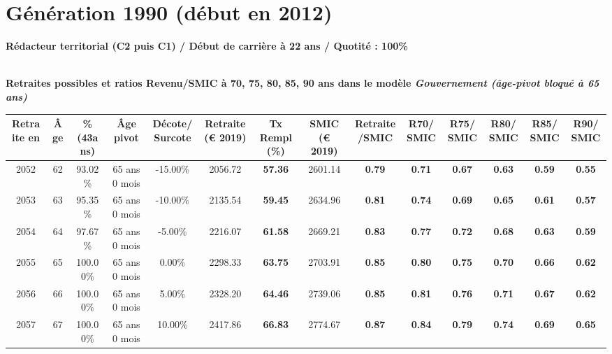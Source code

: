 \newpage 
 
\section{Génération 1990 (début en 2012)\label{Redacteur_100_1990_22_0}} 
 
{\bf \noindent Rédacteur territorial (C2 puis C1) / Début de carrière à 22 ans / Quotité : 100\%}  ~ 

 ~\\{\bf \noindent Retraites possibles et ratios Revenu/SMIC à 70, 75, 80, 85, 90 ans dans le modèle \emph{Gouvernement (âge-pivot bloqué à 65 ans)}}  
 
\begin{adjustbox}{max width=\textwidth} 
\begin{tabular}[htb]{|c|c||c|c|c||c|c||c|c||c|c|c|c|c|} 
\hline 
 Retraite en &  Âge &  \%(43ans) &  Âge pivot &  Décote/Surcote &  Retraite (\euro{} 2019) &  Tx Rempl(\%) &  SMIC (\euro{} 2019) &  Retraite/SMIC &  R70/SMIC &  R75/SMIC &  R80/SMIC &  R85/SMIC &  R90/SMIC \\ 
\hline \hline 
 2052 &  62 &  93.02\% &  65 ans 0 mois &  -15.00\% &  2056.72 &  {\bf 57.36} &  2601.14 &  {\bf {\color{red} 0.79}} &  {\bf {\color{red} 0.71}} &  {\bf {\color{red} 0.67}} &  {\bf {\color{red} 0.63}} &  {\bf {\color{red} 0.59}} &  {\bf {\color{red} 0.55}} \\ 
\hline 
 2053 &  63 &  95.35\% &  65 ans 0 mois &  -10.00\% &  2135.54 &  {\bf 59.45} &  2634.96 &  {\bf {\color{red} 0.81}} &  {\bf {\color{red} 0.74}} &  {\bf {\color{red} 0.69}} &  {\bf {\color{red} 0.65}} &  {\bf {\color{red} 0.61}} &  {\bf {\color{red} 0.57}} \\ 
\hline 
 2054 &  64 &  97.67\% &  65 ans 0 mois &  -5.00\% &  2216.07 &  {\bf 61.58} &  2669.21 &  {\bf {\color{red} 0.83}} &  {\bf {\color{red} 0.77}} &  {\bf {\color{red} 0.72}} &  {\bf {\color{red} 0.68}} &  {\bf {\color{red} 0.63}} &  {\bf {\color{red} 0.59}} \\ 
\hline 
 2055 &  65 &  100.00\% &  65 ans 0 mois &  0.00\% &  2298.33 &  {\bf 63.75} &  2703.91 &  {\bf {\color{red} 0.85}} &  {\bf {\color{red} 0.80}} &  {\bf {\color{red} 0.75}} &  {\bf {\color{red} 0.70}} &  {\bf {\color{red} 0.66}} &  {\bf {\color{red} 0.62}} \\ 
\hline 
 2056 &  66 &  100.00\% &  65 ans 0 mois &  5.00\% &  2328.20 &  {\bf 64.46} &  2739.06 &  {\bf {\color{red} 0.85}} &  {\bf {\color{red} 0.81}} &  {\bf {\color{red} 0.76}} &  {\bf {\color{red} 0.71}} &  {\bf {\color{red} 0.67}} &  {\bf {\color{red} 0.62}} \\ 
\hline 
 2057 &  67 &  100.00\% &  65 ans 0 mois &  10.00\% &  2417.86 &  {\bf 66.83} &  2774.67 &  {\bf {\color{red} 0.87}} &  {\bf {\color{red} 0.84}} &  {\bf {\color{red} 0.79}} &  {\bf {\color{red} 0.74}} &  {\bf {\color{red} 0.69}} &  {\bf {\color{red} 0.65}} \\ 
\hline 
\hline 
\end{tabular} 
\end{adjustbox} 
 

